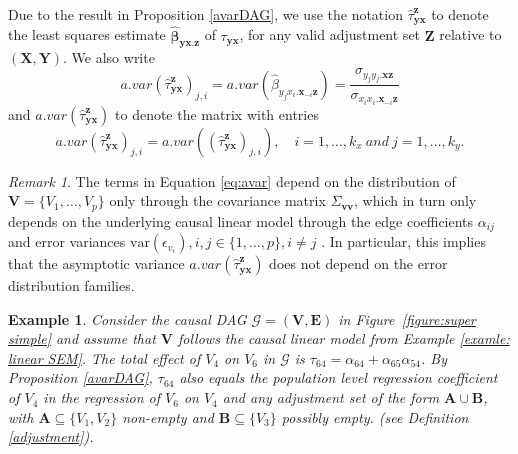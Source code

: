 \documentclass[11pt,a4paper]{article}
\newtheorem{Example}[Satz]{Example}
\theoremstyle{definition}
\theoremstyle{remark}
\newtheorem{Remark}[Satz]{Remark}
\newcommand{\g}[1][G]{\mathcal{#1}}
\begin{document}



Due to the result in Proposition \ref{avarDAG}, we use the notation $\hat{\tau}^{\mathbf{z}}_{\mathbf{yx}}$ to denote the least squares estimate $\boldsymbol{\hat{\beta}}_{\mathbf{y}\mathbf{x}.\mathbf{z}}$ of $\tau_{\mathbf{y}\mathbf{x}}$, for any valid adjustment set $\mathbf{Z}$ relative to $(\mathbf{X},\mathbf{Y})$. We also write 
\begin{equation}
a.var(\hat{\tau}^{\mathbf{z}}_{\mathbf{yx}})_{j,i} = a.var(\hat{\beta}_{y_jx_i.\mathbf{x}_{-i}\mathbf{z}}) = \frac{\sigma_{y_jy_j.\mathbf{xz}}}{\sigma_{x_ix_i.\mathbf{x}_{-i}\mathbf{z}}}
\label{eq:avar}
\end{equation}
and $a.var(\hat{\tau}^{\mathbf{z}}_{\mathbf{yx}})$ to denote the matrix with entries
\[
a.var(\hat{\tau}^{\mathbf{z}}_{\mathbf{yx}})_{j,i} = a.var((\hat{\tau}^{\mathbf{z}}_{\mathbf{yx}})_{j,i}), \quad i=1, \dots, k_x \ \textit{and} \ j=1, \dots, k_y.
\]

\begin{Remark}
	The terms in Equation \eqref{eq:avar} depend on the distribution of $\mathbf{V}=\{V_1,\dots,V_p\}$ only through the covariance matrix $\Sigma_{\mathbf{vv}}$, which in turn only depends on the underlying causal linear model through the edge coefficients $\alpha_{ij}$ and error variances $\mathrm{var}(\epsilon_{v_i}), i,j \in \{1,\dots,p\}, i \neq j$ \citep[cf.][]{nandy2017estimating}. 
	In particular, this implies that the asymptotic variance $a.var(\hat{\tau}^{\mathbf{z}}_{\mathbf{yx}})$ does not depend on the error
	distribution families.
	\label{remark: var enough}
\end{Remark}



\begin{Example}
	Consider the causal DAG $\g=(\mathbf{V},\mathbf{E})$ in Figure~\ref{figure:super simple} and assume that $\mathbf{V}$ follows the causal linear model from Example \ref{examle: linear SEM}.
	The total effect of $V_4$ on $V_6$ in $\g$ is $\tau_{64} = \alpha_{64} + \alpha_{65}\alpha_{54}$. 
	By Proposition \ref{avarDAG}, $\tau_{64}$ also equals the  population level regression coefficient of $V_4$ in the regression of $V_6$ on $V_4$ and any adjustment set of the form $\mathbf{A} \cup \mathbf{B}$, with $\mathbf{A} \subseteq \{V_1,V_2\}$ non-empty and $\mathbf{B} \subseteq \{V_3\}$ possibly empty. (see Definition \ref{adjustment}).
	
	\label{ex:total effect}
\end{Example}
\end{document}

